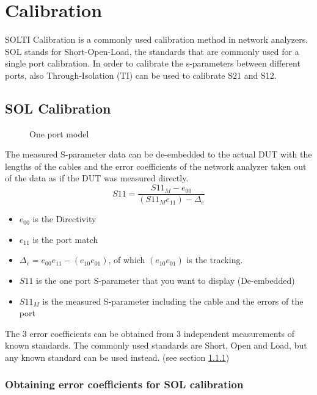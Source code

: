 \section{Calibration}
SOLTI Calibration is a commonly used calibration method in network analyzers. SOL stands for Short-Open-Load, the standards that are commonly used for a single port calibration. In order to calibrate the s-parameters between different ports, also Through-Isolation (TI) can be used to calibrate S21 and S12.




\subsection{SOL Calibration}
\label{sec:solcal}

\begin{figure}[H]
	\centering
	
	\caption{One port model}
	\label{fig:oneportmodel}
\end{figure}


The measured S-parameter data can be de-embedded to the actual DUT with the lengths of the cables and the error coefficients of the network analyzer taken out of the data as if the DUT was measured directly.
	\begin{equation}
	\label{eqn:solcal}
	S11=\frac{S11_{M}-e_{00}}{(S11_{M}e_{11})-\Delta_{e}}
	\end{equation}
	\begin{itemize}
		\item $e_{00}$ is the Directivity
		\item $e_{11}$ is the port match
		\item $\Delta_{e} = e_{00}e_{11}-(e_{10}e_{01})$, of which $(e_{10}e_{01})$ is the tracking.
		\item $S11$ is the one port S-parameter that you want to display (De-embedded)
		\item 	$S11_M$ is the measured S-parameter including the cable and the errors of the port
	\end{itemize}

	The 3 error coefficients can be obtained from 3 independent measurements of known standards. The commonly used standards are Short, Open and Load, but any known standard can be used instead. (see section \ref{sec:obtainingerrorcoefsSOL})
\newpage
\subsubsection{Obtaining error coefficients for SOL calibration}
\label{sec:obtainingerrorcoefsSOL}

